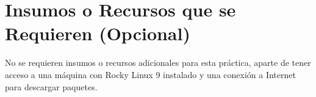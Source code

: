 \section{Insumos o Recursos que se Requieren (Opcional)}
No se requieren insumos o recursos adicionales para esta práctica, aparte de tener acceso a una máquina con Rocky Linux 9 instalado y una conexión a Internet para descargar paquetes.

